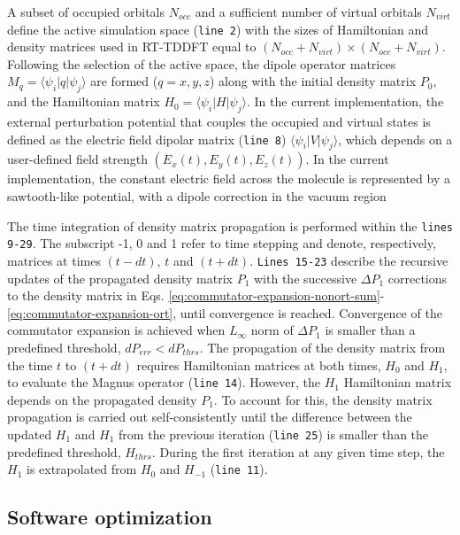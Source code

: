 \documentclass[journal=jctcce,manuscript=article,etalmode=truncate,maxauthors=10,layout=twocolumn,9pt]{achemso}   %
\begin{document}
A subset of occupied orbitals $N_{occ}$ and a sufficient number of virtual orbitals $N_{virt}$  define the active simulation space (\texttt{line 2}) 
   with  the sizes of Hamiltonian 
and density matrices used in RT-TDDFT equal to $(N_{occ}+N_{virt})\times (N_{occ}+N_{virt})$.
Following the selection  of the active space,  the dipole operator matrices
 $M_q=\langle \psi_i|q| \psi_j \rangle$ are formed  ($q=x,y,z$) along with the initial density matrix  $P_0$,
and the Hamiltonian matrix $H_0=\langle \psi_i|H| \psi_j \rangle$. 
In the current implementation, the external perturbation  potential 
 that couples the occupied and virtual states  is defined  as the electric field dipolar matrix  (\texttt{line 8})
$\langle \psi_i|V| \psi_j \rangle$, which depends on a user-defined field strength $(E_x(t), E_y(t), E_z(t))$. In the current implementation, the constant electric field across the molecule is represented by a sawtooth-like potential, with a dipole correction in the vacuum region \cite{bengtsson-99}

The time   integration  of density matrix propagation is performed within the \texttt{lines 9-29}.
The subscript -1, 0  and 1  refer  to  time stepping and denote, respectively, matrices at times
 $(t-dt)$, $t$  and $(t+dt)$.  \texttt{Lines 15-23}   describe the recursive updates of the propagated  
density matrix  $P_1$  with the successive $\Delta P_1$ corrections to the density matrix
in Eqs. \ref{eq:commutator-expansion-nonort-sum}-\ref{eq:commutator-expansion-ort}, until convergence is  reached. 
Convergence of the commutator expansion is achieved when  $L_\infty$ norm  of $\Delta P_1$ 
is smaller than a predefined threshold, $dP_{err}< dP_{thrs}$.
The  propagation of the density matrix  from the time $t$ to $(t+dt)$ requires Hamiltonian matrices at
both times, $H_0$ and $H_1$, to evaluate the Magnus operator (\texttt{line 14}). 
However, the $H_1$ Hamiltonian matrix depends on the  propagated density $P_1$.
To account for this, the density matrix  propagation is carried out self-consistently until the difference between 
the updated $H_1$  and $H_1$ from the previous iteration (\texttt{line 25}) is smaller than the predefined threshold, $H_{thrs}$.
During the first  iteration at any given time step, the  $H_1$ is extrapolated 
from  $H_0$ and $H_{-1}$ (\texttt{line 11}).




\subsection{ Software optimization}
\end{document}
